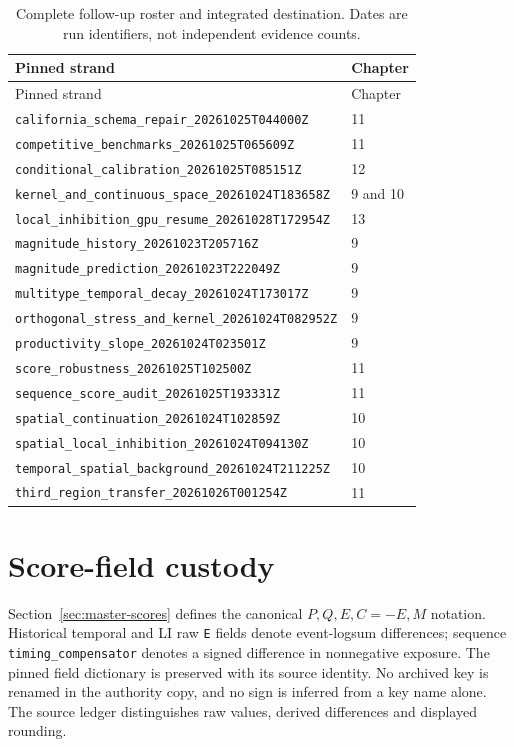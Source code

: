 \begin{longtable}{@{}p{}p{}@{}}
\caption{Complete follow-up roster and integrated destination. Dates are run identifiers, not independent evidence counts.}\\
\toprule Pinned strand & Chapter \\\midrule\endfirsthead
\toprule Pinned strand & Chapter \\\midrule\endhead
\nolinkurl{california_schema_repair_20261025T044000Z} & 11 \\
\nolinkurl{competitive_benchmarks_20261025T065609Z} & 11 \\
\nolinkurl{conditional_calibration_20261025T085151Z} & 12 \\
\nolinkurl{kernel_and_continuous_space_20261024T183658Z} & 9 and 10 \\
\nolinkurl{local_inhibition_gpu_resume_20261028T172954Z} & 13 \\
\nolinkurl{magnitude_history_20261023T205716Z} & 9 \\
\nolinkurl{magnitude_prediction_20261023T222049Z} & 9 \\
\nolinkurl{multitype_temporal_decay_20261024T173017Z} & 9 \\
\nolinkurl{orthogonal_stress_and_kernel_20261024T082952Z} & 9 \\
\nolinkurl{productivity_slope_20261024T023501Z} & 9 \\
\nolinkurl{score_robustness_20261025T102500Z} & 11 \\
\nolinkurl{sequence_score_audit_20261025T193331Z} & 11 \\
\nolinkurl{spatial_continuation_20261024T102859Z} & 10 \\
\nolinkurl{spatial_local_inhibition_20261024T094130Z} & 10 \\
\nolinkurl{temporal_spatial_background_20261024T211225Z} & 10 \\
\nolinkurl{third_region_transfer_20261026T001254Z} & 11 \\
\bottomrule\end{longtable}

\section{Score-field custody}

Section~\ref{sec:master-scores} defines the canonical $P,Q,E,C=-E,M$ notation. Historical temporal and LI raw \texttt{E} fields denote event-logsum differences; sequence \texttt{timing\_compensator} denotes a signed difference in nonnegative exposure. The pinned field dictionary is preserved with its source identity. No archived key is renamed in the authority copy, and no sign is inferred from a key name alone. The source ledger distinguishes raw values, derived differences and displayed rounding.
